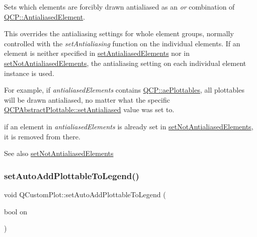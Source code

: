 Sets which elements are forcibly drawn antialiased as an {\itshape or} combination of \mbox{\hyperlink{namespace_q_c_p_ae55dbe315d41fe80f29ba88100843a0c}{Q\+C\+P\+::\+Antialiased\+Element}}.

This overrides the antialiasing settings for whole element groups, normally controlled with the {\itshape set\+Antialiasing} function on the individual elements. If an element is neither specified in \mbox{\hyperlink{class_q_custom_plot_af6f91e5eab1be85f67c556e98c3745e8}{set\+Antialiased\+Elements}} nor in \mbox{\hyperlink{class_q_custom_plot_ae10d685b5eabea2999fb8775ca173c24}{set\+Not\+Antialiased\+Elements}}, the antialiasing setting on each individual element instance is used.

For example, if {\itshape antialiased\+Elements} contains \mbox{\hyperlink{namespace_q_c_p_ae55dbe315d41fe80f29ba88100843a0ca4145e4251b0cf2dbedabeea0a38f84f6}{Q\+C\+P\+::ae\+Plottables}}, all plottables will be drawn antialiased, no matter what the specific \mbox{\hyperlink{class_q_c_p_layerable_a4fd43e89be4a553ead41652565ff0581}{Q\+C\+P\+Abstract\+Plottable\+::set\+Antialiased}} value was set to.

if an element in {\itshape antialiased\+Elements} is already set in \mbox{\hyperlink{class_q_custom_plot_ae10d685b5eabea2999fb8775ca173c24}{set\+Not\+Antialiased\+Elements}}, it is removed from there.

\begin{DoxySeeAlso}{See also}
\mbox{\hyperlink{class_q_custom_plot_ae10d685b5eabea2999fb8775ca173c24}{set\+Not\+Antialiased\+Elements}} 
\end{DoxySeeAlso}
\mbox{\label{class_q_custom_plot_ad8858410c2db47b7104040a3aa61c3fc}} 
\subsubsection{\texorpdfstring{set\+Auto\+Add\+Plottable\+To\+Legend()}{setAutoAddPlottableToLegend()}}
{\footnotesize\ttfamily void Q\+Custom\+Plot\+::set\+Auto\+Add\+Plottable\+To\+Legend (\begin{DoxyParamCaption}\item[{bool}]{on }\end{DoxyParamCaption})}

